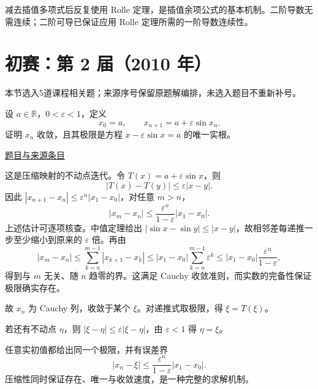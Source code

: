 \documentclass[12pt,fontset=fandol]{ctexart}
\begin{document}
\begin{remark}[方法与条件]减去插值多项式后反复使用 Rolle 定理，是插值余项公式的基本机制。二阶导数无需连续；二阶可导已保证应用 Rolle 定理所需的一阶导数连续性。\end{remark}

\section{初赛：第 2 届（2010 年）}

本节选入5道课程相关题；来源序号保留原题解编排，未选入题目不重新补号。

\begin{example}[来源序号1]\label{ex:pre02-math:1}\label{pr:pre02-math:1}

设 $a\in\mathbb R$，$0<\varepsilon<1$，定义
\[
x_0=a,\qquad x_{n+1}=a+\varepsilon\sin x_n.
\]
证明 $x_n$ 收敛，且其极限是方程 $x-\varepsilon\sin x=a$ 的唯一实根。

\par\href{https://github.com/lzxcr/cmc-mathematics/blob/64916fa1fdbc3e444a652eca204d5669058ee321/src/problems/preliminary/02/01.md}{题目与来源条目}

\end{example}

\begin{solve}\label{ans:pre02-math:1}

这是压缩映射的不动点迭代。令 $T(x)=a+\varepsilon\sin x$，则
\[
|T(x)-T(y)|\le\varepsilon|x-y|.
\]
因此 $|x_{n+1}-x_n|\le\varepsilon^n|x_1-x_0|$，对任意 $m>n$，
\[
|x_m-x_n|\le\frac{\varepsilon^n}{1-\varepsilon}|x_1-x_0|.
\]
上述估计可逐项核查。中值定理给出 $|\sin x-\sin y|\le|x-y|$，故相邻差每递推一步至少缩小到原来的 $\varepsilon$ 倍。再由
\[
|x_m-x_n|\le\sum_{k=n}^{m-1}|x_{k+1}-x_k|
\le |x_1-x_0|\sum_{k=n}^{m-1}\varepsilon^k
\le |x_1-x_0|\frac{\varepsilon^n}{1-\varepsilon},
\]
得到与 $m$ 无关、随 $n$ 趋零的界。这满足 Cauchy 收敛准则，而实数的完备性保证极限确实存在。

故 $x_n$ 为 Cauchy 列，收敛于某个 $\xi$。对递推式取极限，得 $\xi=T(\xi)$。

若还有不动点 $\eta$，则 $|\xi-\eta|\le\varepsilon|\xi-\eta|$，由 $\varepsilon<1$ 得 $\eta=\xi$。

\end{solve}

\begin{remark}[方法与条件]任意实初值都给出同一个极限，并有误差界
\[
|x_n-\xi|\le\frac{\varepsilon^n}{1-\varepsilon}|x_1-x_0|.
\]
压缩性同时保证存在、唯一与收敛速度，是一种完整的求解机制。\end{remark}
\end{document}
